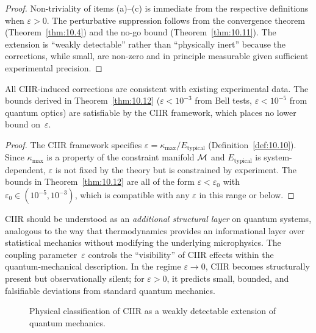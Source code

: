 \begin{proof}
Non-triviality of items (a)--(c) is immediate from the respective
definitions when $\varepsilon>0$.  The perturbative suppression
follows from the convergence theorem (Theorem~\ref{thm:10.4}) and the
no-go bound (Theorem~\ref{thm:10.11}).  The extension is ``weakly
detectable'' rather than ``physically inert'' because the corrections,
while small, are non-zero and in principle measurable given sufficient
experimental precision.
\end{proof}

\begin{corollary}
\label{cor:10.2}
All CIIR-induced corrections are consistent with existing experimental
data.  The bounds derived in Theorem~\ref{thm:10.12}
($\varepsilon<10^{-3}$ from Bell tests, $\varepsilon<10^{-5}$ from
quantum optics) are satisfiable by the CIIR framework, which places
no lower bound on~$\varepsilon$.
\end{corollary}

\begin{proof}
The CIIR framework specifies $\varepsilon=\kappa_{\max}/E_{\mathrm{typical}}$
(Definition~\ref{def:10.10}).  Since $\kappa_{\max}$ is a property of
the constraint manifold $\mathcal{M}$ and $E_{\mathrm{typical}}$ is
system-dependent, $\varepsilon$ is not fixed by the theory but is
constrained by experiment.  The bounds in Theorem~\ref{thm:10.12} are
all of the form $\varepsilon<\varepsilon_0$ with
$\varepsilon_0\in(10^{-5},10^{-3})$, which is compatible with any
$\varepsilon$ in this range or below.
\end{proof}

\begin{remark}
\label{rem:10.7}
CIIR should be understood as an \emph{additional structural layer} on
quantum systems, analogous to the way that thermodynamics provides an
informational layer over statistical mechanics without modifying the
underlying microphysics.  The coupling parameter~$\varepsilon$ controls
the ``visibility'' of CIIR effects within the quantum-mechanical
description.  In the regime $\varepsilon\to 0$, CIIR becomes
structurally present but observationally silent; for
$\varepsilon>0$, it predicts small, bounded, and falsifiable
deviations from standard quantum mechanics.
\end{remark}

\begin{figure}[t]
\centering
{}
\caption{Physical classification of CIIR as a weakly detectable
  extension of quantum mechanics.}
\label{fig:c10:status}
\end{figure}

